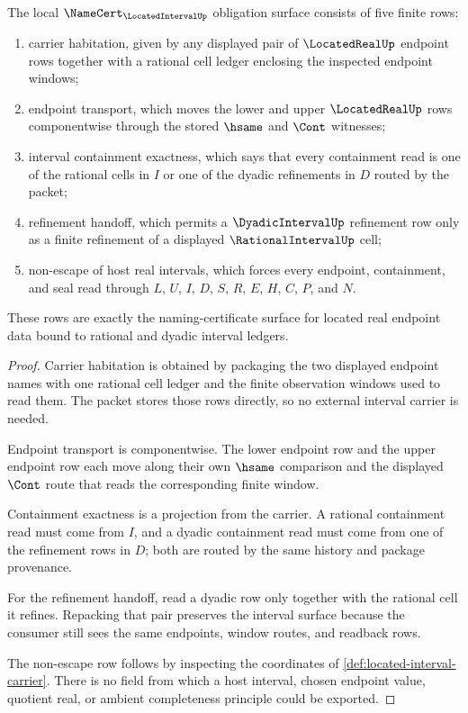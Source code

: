 \begin{theorem}
\label{thm:located-interval-namecert-obligations}
The local $\NameCert_{\LocatedIntervalUp}$ obligation surface consists of five finite rows:
\begin{enumerate}
\item carrier habitation, given by any displayed pair of $\LocatedRealUp$ endpoint rows together with a rational cell ledger enclosing the inspected endpoint windows;
\item endpoint transport, which moves the lower and upper $\LocatedRealUp$ rows componentwise through the stored $\hsame$ and $\Cont$ witnesses;
\item interval containment exactness, which says that every containment read is one of the rational cells in $I$ or one of the dyadic refinements in $D$ routed by the packet;
\item refinement handoff, which permits a $\DyadicIntervalUp$ refinement row only as a finite refinement of a displayed $\RationalIntervalUp$ cell;
\item non-escape of host real intervals, which forces every endpoint, containment, and seal read through $L$, $U$, $I$, $D$, $S$, $R$, $E$, $H$, $C$, $P$, and $N$.
\end{enumerate}
These rows are exactly the naming-certificate surface for located real endpoint data bound to rational and dyadic interval ledgers.
\end{theorem}
\begin{proof}
Carrier habitation is obtained by packaging the two displayed endpoint names with one rational cell ledger and the finite observation windows used to read them. The packet stores those rows directly, so no external interval carrier is needed.

Endpoint transport is componentwise. The lower endpoint row and the upper endpoint row each move along their own $\hsame$ comparison and the displayed $\Cont$ route that reads the corresponding finite window.

Containment exactness is a projection from the carrier. A rational containment read must come from $I$, and a dyadic containment read must come from one of the refinement rows in $D$; both are routed by the same history and package provenance.

For the refinement handoff, read a dyadic row only together with the rational cell it refines. Repacking that pair preserves the interval surface because the consumer still sees the same endpoints, window routes, and readback rows.

The non-escape row follows by inspecting the coordinates of \autoref{def:located-interval-carrier}. There is no field from which a host interval, chosen endpoint value, quotient real, or ambient completeness principle could be exported.
\end{proof}

